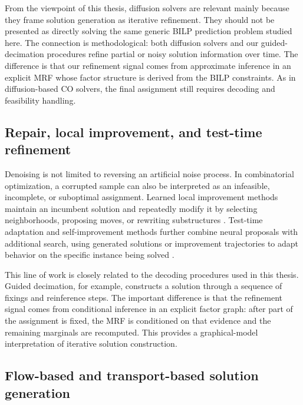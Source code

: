 From the viewpoint of this thesis, diffusion solvers are relevant mainly because they frame solution generation as iterative refinement. They should not be presented as directly solving the same generic BILP prediction problem studied here. The connection is methodological: both diffusion solvers and our guided-decimation procedures refine partial or noisy solution information over time. The difference is that our refinement signal comes from approximate inference in an explicit MRF whose factor structure is derived from the BILP constraints. As in diffusion-based CO solvers, the final assignment still requires decoding and feasibility handling.

\subsection{Repair, local improvement, and test-time refinement}
\label{subsec:rw_repair_refinement}

Denoising is not limited to reversing an artificial noise process. In combinatorial optimization, a corrupted sample can also be interpreted as an infeasible, incomplete, or suboptimal assignment. Learned local improvement methods maintain an incumbent solution and repeatedly modify it by selecting neighborhoods, proposing moves, or rewriting substructures \cite{chen_learning_2019,garmendia_neural_2024,falkner_learning_2023}. Test-time adaptation and self-improvement methods further combine neural proposals with additional search, using generated solutions or improvement trajectories to adapt behavior on the specific instance being solved \cite{verdu_scaling_2024,pirnay_self-improvement_2024,li_generation_2025}.

This line of work is closely related to the decoding procedures used in this thesis. Guided decimation, for example, constructs a solution through a sequence of fixings and reinference steps. The important difference is that the refinement signal comes from conditional inference in an explicit factor graph: after part of the assignment is fixed, the MRF is conditioned on that evidence and the remaining marginals are recomputed. This provides a graphical-model interpretation of iterative solution construction.

\subsection{Flow-based and transport-based solution generation}
\label{subsec:rw_flow_co}

